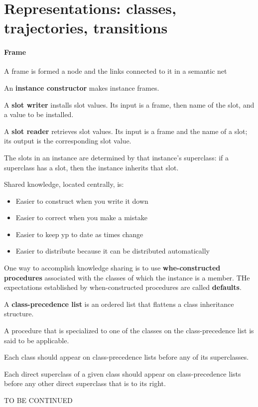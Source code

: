 \section{Representations: classes, trajectories, transitions}

\paragraph{Frame} A frame is formed a node and the links connected
to it in a semantic net

An \textbf{instance constructor} makes instance frames.

A \textbf{slot writer} installs slot values. Its input is a frame,
then name of the slot, and a value to be installed.

A \textbf{slot reader}  retrieves slot values. Its input is a
frame and the name of a slot; its output is the corresponding slot
value.

The slots in an instance are determined by that instance's
superclass: if a superclass has a slot, then the instance inherits
that slot.

Shared knowledge, located centrally, is:
\begin{itemize}
  \item Easier to construct when you write it down
  \item Easier to correct when you make a mistake
  \item Easier to keep yp to date as times change
  \item Easier to distribute because it can be distributed
    automatically
\end{itemize}

One way to accomplish knowledge sharing is to use
\textbf{whe-constructed procedures} associated with the classes of
which the instance is a member. THe expectations established by
when-constructed procedures are called \textbf{defaults}.

A \textbf{class-precedence list} is an ordered list that flattens
a class inheritance structure.

A procedure that is specialized to one of the classes on the
class-precedence list is said to be applicable.

Each class should appear on class-precedence lists before any of
its superclasses.

Each direct superclass of a given class should appear on
class-precedence lists before any other direct superclass that is
to its right.

TO BE CONTINUED
